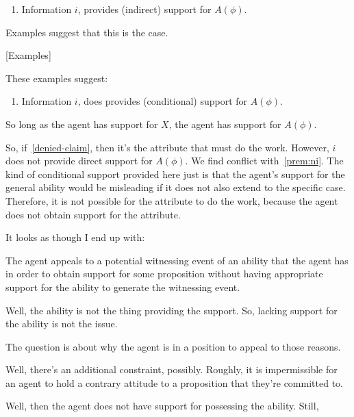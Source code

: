 \documentclass[10pt]{article}
\begin{document}
\begin{enumerate}
\item\label{abGen:i:indirect} Information \(i\), provides (indirect) support for \(A(\phi)\).
\end{enumerate}

Examples suggest that this is the case.

[Examples]

These examples suggest:

\begin{enumerate}
\item\label{abGen:i:conditional} Information \(i\), does provides (conditional) support for \(A(\phi)\).
\end{enumerate}

So long as the agent has support for \(X\), the agent has support for \(A(\phi)\).


So, if~\ref{denied-claim}, then it's the attribute that must do the work.
However, \(i\) does not provide direct support for \(A(\phi)\).
We find conflict with~\ref{prem:ni}.
The kind of conditional support provided here just is that the agent's support for the general ability would be misleading if it does not also extend to the specific case.
Therefore, it is not possible for the attribute to do the work, because the agent does not obtain support for the attribute.




\newpage

It looks as though I end up with:

The agent appeals to a potential witnessing event of an ability that the agent has in order to obtain support for some proposition without having appropriate support for the ability to generate the witnessing event.

Well, the ability is not the thing providing the support.
So, lacking support for the ability is not the issue.

The question is about why the agent is in a position to appeal to those reasons.

Well, there's an additional constraint, possibly.
Roughly, it is impermissible for an agent to hold a contrary attitude to a proposition that they're committed to.

Well, then the agent does not have support for possessing the ability.
Still, 
\end{document}
